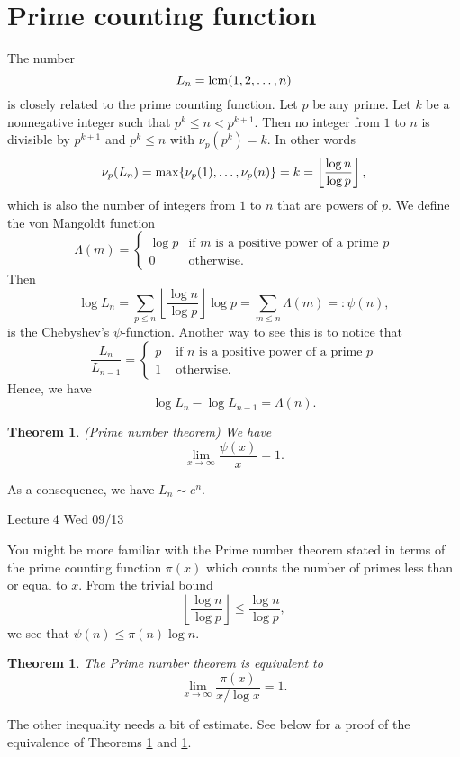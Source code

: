 \documentclass{article}
\def\lcm{{\rm lcm}}
\def\max{{\rm max}}
\newtheorem{theorem}[subsection]{Theorem}
\newcommand{\add}[1]{{\color{blue} #1}}
\begin{document}
\section{Prime counting function}
The number $$L_n = \lcm(1,2,\ldots, n)$$
is closely related to the prime counting function. Let $p$ be any prime. Let $k$ be a nonnegative integer such that $p^k\leq n < p^{k+1}$. Then no integer from $1$ to $n$ is divisible by $p^{k+1}$ and $p^k\leq n$ with $\nu_p(p^k) = k$. In other words $$\nu_p(L_n) = \max\{\nu_p(1),\ldots,\nu_p(n)\} = k = \left\lfloor\frac{\log n}{\log p}\right\rfloor,$$ which is also the number of integers from $1$ to $n$ that are powers of $p$. We define the von Mangoldt function $$\Lambda(m) = \begin{cases}
    \log p&\mbox{if }m\mbox{ is a positive power of a prime }p\\
    0&\mbox{otherwise}.
\end{cases}$$
Then $$\log L_n = \sum_{p\leq n}\left\lfloor\frac{\log n}{\log p}\right\rfloor\log p = \sum_{m\leq n}\Lambda(m) =: \psi(n),$$
is the Chebyshev's $\psi$-function. Another way to see this is to notice that
$$\frac{L_n}{L_{n-1}} = \begin{cases}
    p&\mbox{ if }n\mbox{ is a positive power of a prime }p\\
    1&\mbox{ otherwise.}
\end{cases}$$
Hence, we have $$\log L_n - \log L_{n-1} = \Lambda(n).$$

\begin{theorem}\label{thm:PMT1}
    (Prime number theorem) We have $$\lim_{x\rightarrow\infty}\frac{\psi(x)}{x} = 1.$$
\end{theorem}
\noindent As a consequence, we have $L_n\sim e^n$.

\begin{center}
    \add{Lecture 4 Wed 09/13}
\end{center}

You might be more familiar with the Prime number theorem stated in terms of the prime counting function
$\pi(x)$ which counts the number of primes less than or equal to $x$. From the trivial bound $$\left\lfloor\frac{\log n}{\log p}\right\rfloor \leq \frac{\log n}{\log p},$$
we see that $\psi(n) \leq \pi(n)\log n$.

\begin{theorem}\label{thm:PMT2}
        The Prime number theorem is equivalent to
    $$\lim_{x\rightarrow\infty}\frac{\pi(x)}{x/\log x} = 1.$$
\end{theorem}
\noindent The other inequality needs a bit of estimate. See below for a proof of the equivalence of Theorems \ref{thm:PMT1} and \ref{thm:PMT2}. 
\end{document}
